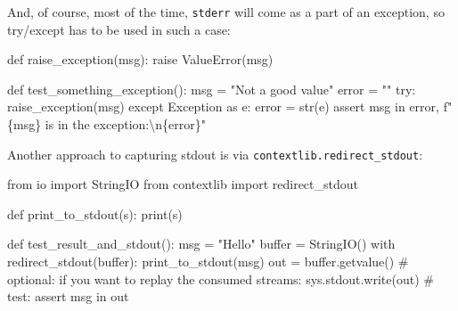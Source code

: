\documentclass[
]{report}
\newenvironment{Shaded}{\begin{snugshade}}{\end{snugshade}}
\newcommand{\BuiltInTok}[1]{\textcolor[rgb]{0.00,0.23,0.31}{#1}}
\newcommand{\CharTok}[1]{\textcolor[rgb]{0.13,0.47,0.30}{#1}}
\newcommand{\CommentTok}[1]{\textcolor[rgb]{0.37,0.37,0.37}{#1}}
\newcommand{\ControlFlowTok}[1]{\textcolor[rgb]{0.00,0.23,0.31}{#1}}
\newcommand{\ImportTok}[1]{\textcolor[rgb]{0.00,0.46,0.62}{#1}}
\newcommand{\KeywordTok}[1]{\textcolor[rgb]{0.00,0.23,0.31}{#1}}
\newcommand{\NormalTok}[1]{\textcolor[rgb]{0.00,0.23,0.31}{#1}}
\newcommand{\OperatorTok}[1]{\textcolor[rgb]{0.37,0.37,0.37}{#1}}
\newcommand{\PreprocessorTok}[1]{\textcolor[rgb]{0.68,0.00,0.00}{#1}}
\newcommand{\SpecialCharTok}[1]{\textcolor[rgb]{0.37,0.37,0.37}{#1}}
\newcommand{\SpecialStringTok}[1]{\textcolor[rgb]{0.13,0.47,0.30}{#1}}
\newcommand{\StringTok}[1]{\textcolor[rgb]{0.13,0.47,0.30}{#1}}
\begin{document}
And, of course, most of the time, \texttt{stderr} will come as a part of
an exception, so try/except has to be used in such a case:

\begin{Shaded}
\begin{Highlighting}[]
\KeywordTok{def}\NormalTok{ raise\_exception(msg):}
    \ControlFlowTok{raise} \PreprocessorTok{ValueError}\NormalTok{(msg)}


\KeywordTok{def}\NormalTok{ test\_something\_exception():}
\NormalTok{    msg }\OperatorTok{=} \StringTok{"Not a good value"}
\NormalTok{    error }\OperatorTok{=} \StringTok{""}
    \ControlFlowTok{try}\NormalTok{:}
\NormalTok{        raise\_exception(msg)}
    \ControlFlowTok{except} \PreprocessorTok{Exception} \ImportTok{as}\NormalTok{ e:}
\NormalTok{        error }\OperatorTok{=} \BuiltInTok{str}\NormalTok{(e)}
        \ControlFlowTok{assert}\NormalTok{ msg }\KeywordTok{in}\NormalTok{ error, }\SpecialStringTok{f"}\SpecialCharTok{\{}\NormalTok{msg}\SpecialCharTok{\}}\SpecialStringTok{ is in the exception:}\CharTok{\textbackslash{}n}\SpecialCharTok{\{}\NormalTok{error}\SpecialCharTok{\}}\SpecialStringTok{"}
\end{Highlighting}
\end{Shaded}

Another approach to capturing stdout is via
\texttt{contextlib.redirect\_stdout}:

\begin{Shaded}
\begin{Highlighting}[]
\ImportTok{from}\NormalTok{ io }\ImportTok{import}\NormalTok{ StringIO}
\ImportTok{from}\NormalTok{ contextlib }\ImportTok{import}\NormalTok{ redirect\_stdout}


\KeywordTok{def}\NormalTok{ print\_to\_stdout(s):}
    \BuiltInTok{print}\NormalTok{(s)}


\KeywordTok{def}\NormalTok{ test\_result\_and\_stdout():}
\NormalTok{    msg }\OperatorTok{=} \StringTok{"Hello"}
    \BuiltInTok{buffer} \OperatorTok{=}\NormalTok{ StringIO()}
    \ControlFlowTok{with}\NormalTok{ redirect\_stdout(}\BuiltInTok{buffer}\NormalTok{):}
\NormalTok{        print\_to\_stdout(msg)}
\NormalTok{    out }\OperatorTok{=} \BuiltInTok{buffer}\NormalTok{.getvalue()}
    \CommentTok{\# optional: if you want to replay the consumed streams:}
\NormalTok{    sys.stdout.write(out)}
    \CommentTok{\# test:}
    \ControlFlowTok{assert}\NormalTok{ msg }\KeywordTok{in}\NormalTok{ out}
\end{Highlighting}
\end{Shaded}
\end{document}
